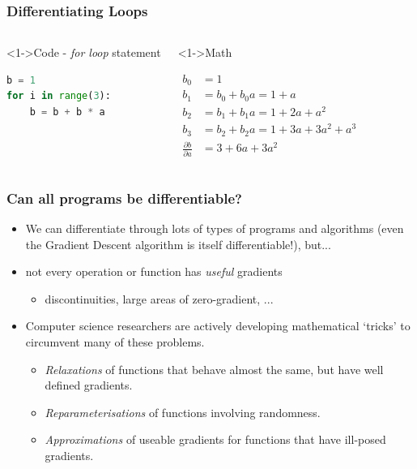 \documentclass[]{article}
\begin{document}
\begin{frame}[fragile]
\frametitle{Differentiating Loops}
\begin{columns}
    \begin{block}<1->{Code - \emph{for loop} statement}
    \begin{minipage}[c][3.5cm][c]{\linewidth} 
\begin{lstlisting}[language=python]
b = 1
for i in range(3):
    b = b + b * a
\end{lstlisting}
	\end{minipage}
    \end{block}

	\begin{block}<1->{Math}
	\begin{minipage}[c][3.5cm][c]{\linewidth}\vspace{-0.75cm}%
	\begin{align*}
	b_0 &= 1 \\
	b_1 &= b_0 + b_0 a = 1 + a \\
	b_2 &= b_1 + b_1 a = 1 + 2a + a^2 \\
	b_3 &= b_2 + b_2 a = 1 + 3a + 3a^2 + a^3 \\
	\frac{\partial b}{\partial a} &= 3 + 6a + 3a^2
	\end{align*}
   \end{minipage}
	\end{block}
\end{columns}
\end{frame}



\begin{frame}
\frametitle{Can all programs be differentiable?}

\begin{itemize}
	\item<+-> We can differentiate through lots of types of programs and algorithms (even the Gradient Descent algorithm is itself differentiable!), but...
	\item<+-> not every operation or function has \emph{useful} gradients
	\begin{itemize}
		\item<+-> discontinuities, large areas of zero-gradient, ...
	\end{itemize}
	\item<+-> Computer science researchers are actively developing mathematical `tricks' to circumvent many of these problems.
	\begin{itemize}
		\item \emph{Relaxations} of functions that behave almost the same, but have well defined gradients.
		\item \emph{Reparameterisations} of functions involving randomness.
		\item \emph{Approximations} of useable gradients for functions that have ill-posed gradients.
	\end{itemize}
\end{itemize}
\end{frame}
\end{document}
